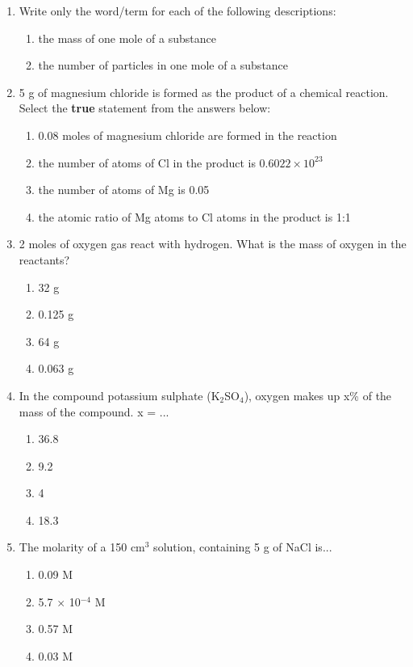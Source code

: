 \begin{eocexercises}{}
\begin{enumerate}
\item{Write only the word/term for each of the following descriptions:}
\begin{enumerate}
\item{the mass of one mole of a substance}
\item{the number of particles in one mole of a substance}
\end{enumerate}

\item{5 g of magnesium chloride is formed as the product of a chemical reaction. Select the \textbf{true} statement from the answers below:}
\begin{enumerate}
\item{0.08 moles of magnesium chloride are formed in the reaction}
\item{the number of atoms of Cl in the product is $0.6022 \times 10^{23}$}
\item{the number of atoms of Mg is 0.05}
\item{the atomic ratio of Mg atoms to Cl atoms in the product is 1:1}
\end{enumerate}

\item{2 moles of oxygen gas react with hydrogen. What is the mass of oxygen in the reactants?}
\begin{enumerate}
\item{32 g}
\item{0.125 g}
\item{64 g}
\item{0.063 g}
\end{enumerate}

\item{In the compound potassium sulphate (K$_{2}$SO$_{4}$), oxygen makes up x\% of the mass of the compound. x = ...}
\begin{enumerate}
\item{36.8}
\item{9.2}
\item{4}
\item{18.3}
\end{enumerate}

\item{The molarity of a 150 cm$^{3}$ solution, containing 5 g of NaCl is...}
\begin{enumerate}
\item{0.09 M}
\item{5.7 $\times$ 10$^{-4}$ M}
\item{0.57 M}
\item{0.03 M}
\end{enumerate}


\end{enumerate}
\end{eocexercises}
